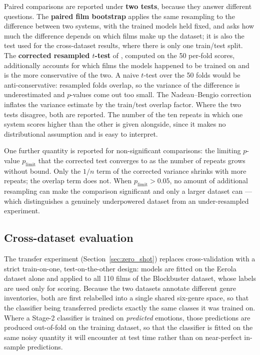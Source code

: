 Paired comparisons are reported under \textbf{two tests}, because they answer different
questions. The \textbf{paired film bootstrap} applies the same resampling to the difference
between two systems, with the trained models held fixed, and asks how much the difference
depends on which films make up the dataset; it is also the test used for the cross-dataset
results, where there is only one train/test split. The \textbf{corrected resampled
$t$-test} of \citet{nadeau2003inference}, computed on the 50 per-fold scores, additionally
accounts for which films the models happened to be trained on and is the more conservative
of the two. A naive $t$-test over the 50 folds would be anti-conservative: resampled folds
overlap, so the variance of the difference is underestimated and $p$-values come out too
small. The Nadeau--Bengio correction inflates the variance estimate by the train/test
overlap factor. Where the two tests disagree, both are reported. The number of the ten
repeats in which one system scores higher than the other is given alongside, since it
makes no distributional assumption and is easy to interpret.

One further quantity is reported for non-significant comparisons: the limiting $p$-value
$p_{\text{limit}}$ that the corrected test converges to as the number of repeats grows
without bound. Only the $1/n$ term of the corrected variance shrinks with more repeats;
the overlap term does not. When $p_{\text{limit}} > 0.05$, no amount of additional
resampling can make the comparison significant and only a larger dataset can --- which
distinguishes a genuinely underpowered dataset from an under-resampled experiment.

\subsection{Cross-dataset evaluation}

The transfer experiment (Section~\ref{sec:zero_shot}) replaces cross-validation with a
strict train-on-one, test-on-the-other design: models are fitted on the Eerola dataset
alone and applied to all 110 films of the Blockbuster dataset, whose labels are used only
for scoring. Because the two datasets annotate different genre inventories, both are first
relabelled into a single shared six-genre space, so that the classifier being transferred
predicts exactly the same classes it was trained on. Where a Stage-2 classifier is trained
on \emph{predicted} emotions, those predictions are produced out-of-fold on the training
dataset, so that the classifier is fitted on the same noisy quantity it will encounter at
test time rather than on near-perfect in-sample predictions.

